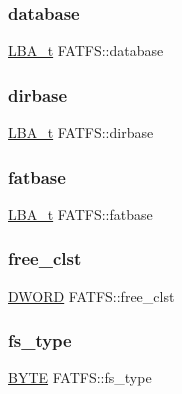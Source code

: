 \subsubsection{\texorpdfstring{database}{database}}
{\footnotesize\ttfamily \mbox{\hyperlink{ff_8h_a1f3c30a83148a28340f009d4e583f087}{L\+B\+A\+\_\+t}} F\+A\+T\+F\+S\+::database}

\mbox{\label{struct_f_a_t_f_s_afc8c3d5d8408b70379f23382c6e28168}} 
\subsubsection{\texorpdfstring{dirbase}{dirbase}}
{\footnotesize\ttfamily \mbox{\hyperlink{ff_8h_a1f3c30a83148a28340f009d4e583f087}{L\+B\+A\+\_\+t}} F\+A\+T\+F\+S\+::dirbase}

\mbox{\label{struct_f_a_t_f_s_a78b1024e7d7d086d132a58ee943b31df}} 
\subsubsection{\texorpdfstring{fatbase}{fatbase}}
{\footnotesize\ttfamily \mbox{\hyperlink{ff_8h_a1f3c30a83148a28340f009d4e583f087}{L\+B\+A\+\_\+t}} F\+A\+T\+F\+S\+::fatbase}

\mbox{\label{struct_f_a_t_f_s_ac834248773bf338df807f0d7e6b6a579}} 
\subsubsection{\texorpdfstring{free\_clst}{free\_clst}}
{\footnotesize\ttfamily \mbox{\hyperlink{ff_8h_ad342ac907eb044443153a22f964bf0af}{D\+W\+O\+RD}} F\+A\+T\+F\+S\+::free\+\_\+clst}

\mbox{\label{struct_f_a_t_f_s_add27d97babe807b573eac98a71dc4ae5}} 
\subsubsection{\texorpdfstring{fs\_type}{fs\_type}}
{\footnotesize\ttfamily \mbox{\hyperlink{ff_8h_a4ae1dab0fb4b072a66584546209e7d58}{B\+Y\+TE}} F\+A\+T\+F\+S\+::fs\+\_\+type}

